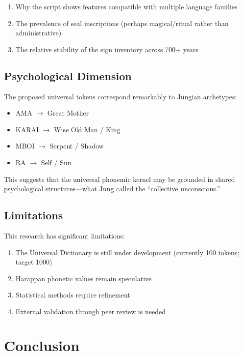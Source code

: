\documentclass[12pt,a4paper]{article}
\begin{document}
\begin{enumerate}
    \item Why the script shows features compatible with multiple language families
    \item The prevalence of seal inscriptions (perhaps magical/ritual rather than administrative)
    \item The relative stability of the sign inventory across 700+ years
\end{enumerate}

\subsection{Psychological Dimension}

The proposed universal tokens correspond remarkably to Jungian archetypes:

\begin{itemize}
    \item AMA $\rightarrow$ Great Mother
    \item KARAI $\rightarrow$ Wise Old Man / King
    \item MBOI $\rightarrow$ Serpent / Shadow
    \item RA $\rightarrow$ Self / Sun
\end{itemize}

This suggests that the universal phonemic kernel may be grounded in shared psychological structures---what Jung called the ``collective unconscious.''

\subsection{Limitations}

This research has significant limitations:

\begin{enumerate}
    \item The Universal Dictionary is still under development (currently 100 tokens; target 1000)
    \item Harappan phonetic values remain speculative
    \item Statistical methods require refinement
    \item External validation through peer review is needed
\end{enumerate}

\section{Conclusion}
\end{document}
